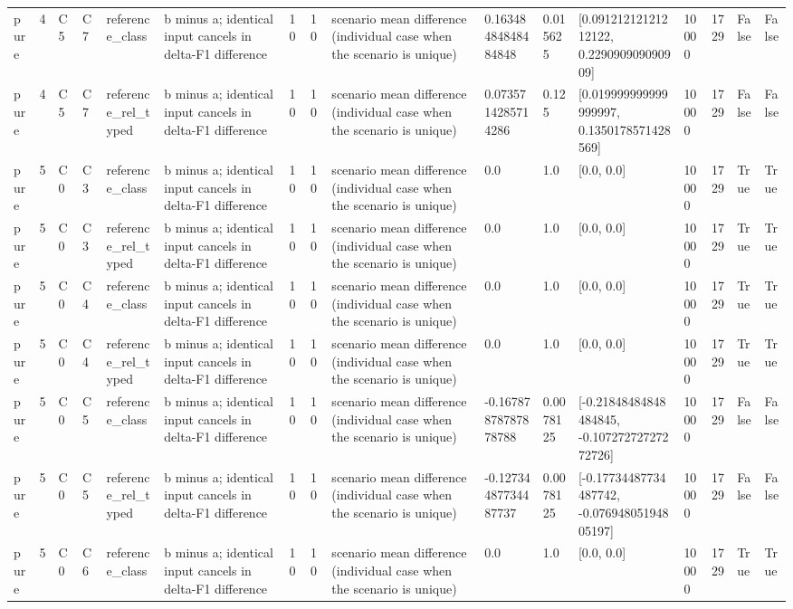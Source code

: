 \begin{tabular}{llllllllllllllll}
pure & 4 & C5 & C7 & reference\_class & b minus a; identical input cancels in delta-F1 difference & 10 & 10 & scenario mean difference (individual case when the scenario is unique) & 0.16348484848484848 & 0.015625 & [0.09121212121212122, 0.229090909090909] & 10000 & 1729 & False & False \\
pure & 4 & C5 & C7 & reference\_rel\_typed & b minus a; identical input cancels in delta-F1 difference & 10 & 10 & scenario mean difference (individual case when the scenario is unique) & 0.0735714285714286 & 0.125 & [0.019999999999999997, 0.1350178571428569] & 10000 & 1729 & False & False \\
pure & 5 & C0 & C3 & reference\_class & b minus a; identical input cancels in delta-F1 difference & 10 & 10 & scenario mean difference (individual case when the scenario is unique) & 0.0 & 1.0 & [0.0, 0.0] & 10000 & 1729 & True & True \\
pure & 5 & C0 & C3 & reference\_rel\_typed & b minus a; identical input cancels in delta-F1 difference & 10 & 10 & scenario mean difference (individual case when the scenario is unique) & 0.0 & 1.0 & [0.0, 0.0] & 10000 & 1729 & True & True \\
pure & 5 & C0 & C4 & reference\_class & b minus a; identical input cancels in delta-F1 difference & 10 & 10 & scenario mean difference (individual case when the scenario is unique) & 0.0 & 1.0 & [0.0, 0.0] & 10000 & 1729 & True & True \\
pure & 5 & C0 & C4 & reference\_rel\_typed & b minus a; identical input cancels in delta-F1 difference & 10 & 10 & scenario mean difference (individual case when the scenario is unique) & 0.0 & 1.0 & [0.0, 0.0] & 10000 & 1729 & True & True \\
pure & 5 & C0 & C5 & reference\_class & b minus a; identical input cancels in delta-F1 difference & 10 & 10 & scenario mean difference (individual case when the scenario is unique) & -0.16787878787878788 & 0.0078125 & [-0.21848484848484845, -0.10727272727272726] & 10000 & 1729 & False & False \\
pure & 5 & C0 & C5 & reference\_rel\_typed & b minus a; identical input cancels in delta-F1 difference & 10 & 10 & scenario mean difference (individual case when the scenario is unique) & -0.12734487734487737 & 0.0078125 & [-0.17734487734487742, -0.07694805194805197] & 10000 & 1729 & False & False \\
pure & 5 & C0 & C6 & reference\_class & b minus a; identical input cancels in delta-F1 difference & 10 & 10 & scenario mean difference (individual case when the scenario is unique) & 0.0 & 1.0 & [0.0, 0.0] & 10000 & 1729 & True & True \\

\end{tabular}
